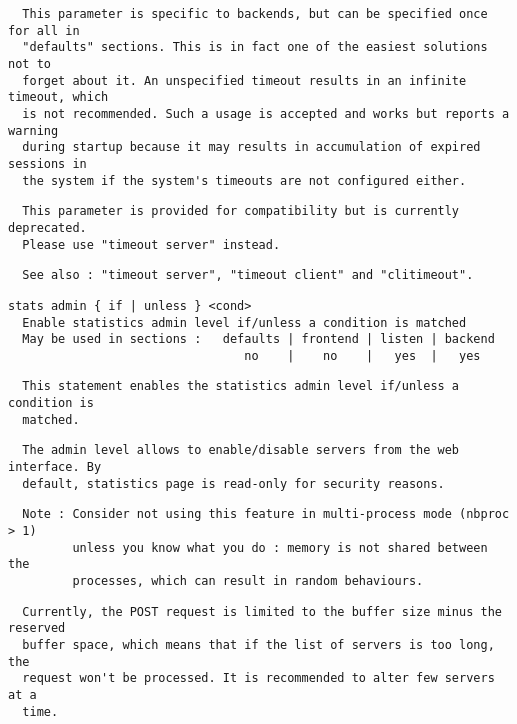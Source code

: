 \begin{verbatim}
  This parameter is specific to backends, but can be specified once for all in
  "defaults" sections. This is in fact one of the easiest solutions not to
  forget about it. An unspecified timeout results in an infinite timeout, which
  is not recommended. Such a usage is accepted and works but reports a warning
  during startup because it may results in accumulation of expired sessions in
  the system if the system's timeouts are not configured either.
\end{verbatim}

\begin{verbatim}
  This parameter is provided for compatibility but is currently deprecated.
  Please use "timeout server" instead.
\end{verbatim}

\begin{verbatim}
  See also : "timeout server", "timeout client" and "clitimeout".
\end{verbatim}

\begin{verbatim}
stats admin { if | unless } <cond>
  Enable statistics admin level if/unless a condition is matched
  May be used in sections :   defaults | frontend | listen | backend
                                 no    |    no    |   yes  |   yes
\end{verbatim}

\begin{verbatim}
  This statement enables the statistics admin level if/unless a condition is
  matched.
\end{verbatim}

\begin{verbatim}
  The admin level allows to enable/disable servers from the web interface. By
  default, statistics page is read-only for security reasons.
\end{verbatim}

\begin{verbatim}
  Note : Consider not using this feature in multi-process mode (nbproc > 1)
         unless you know what you do : memory is not shared between the
         processes, which can result in random behaviours.
\end{verbatim}

\begin{verbatim}
  Currently, the POST request is limited to the buffer size minus the reserved
  buffer space, which means that if the list of servers is too long, the
  request won't be processed. It is recommended to alter few servers at a
  time.
\end{verbatim}

